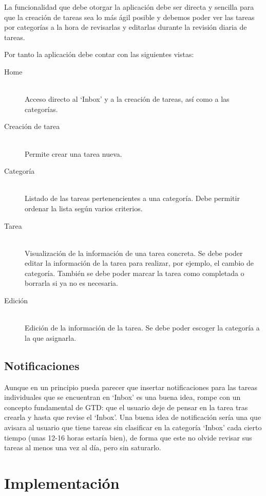 \documentclass[parskip=half*]{scrartcl}
\begin{document}
La funcionalidad que debe otorgar la aplicaci\'on debe ser directa y sencilla para que la creaci\'on de tareas sea lo m\'as \'agil posible y debemos poder ver las tareas por categor\'ias a la hora de revisarlas y editarlas durante la revisi\'on diaria de tareas.

Por tanto la aplicaci\'on debe contar con las siguientes vistas:

\begin{description}
	\item[Home] \hfill \\ Acceso directo al `Inbox' y a la creaci\'on de tareas, as\'i como a las categor\'ias.
	\item[Creaci\'on de tarea] \hfill \\ Permite crear una tarea nueva.
	\item[Categor\'ia] \hfill \\ Listado de las tareas pertenencientes a una categor\'ia. Debe permitir ordenar la lista seg\'un varios criterios.
	\item[Tarea] \hfill \\ Visualizaci\'on de la informaci\'on de una tarea concreta. Se debe poder editar la informaci\'on de la tarea para realizar, por ejemplo, el cambio de categor\'ia. Tambi\'en se debe poder marcar la tarea como completada o borrarla si ya no es necesaria.
	\item[Edici\'on]	\hfill \\ Edici\'on de la informaci\'on de la tarea. Se debe poder escoger la categor\'ia a la que asignarla.
\end{description}

\subsection{Notificaciones}

Aunque en un principio pueda parecer que insertar notificaciones para las tareas individuales que se encuentran en `Inbox' es una buena idea, rompe con un concepto fundamental de GTD: que el usuario deje de pensar en la tarea tras crearla y hasta que revise el `Inbox'. Una buena idea de notificaci\'on ser\'ia una que avisara al usuario que tiene tareas sin clasificar en la categor\'ia `Inbox' cada cierto tiempo (unas 12-16 horas estar\'ia bien), de forma que este no olvide revisar sus tareas al menos una vez al d\'ia, pero sin saturarlo.

\section{Implementaci\'on}
\end{document}
